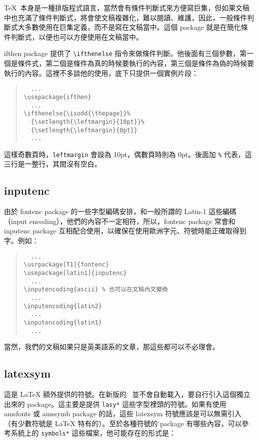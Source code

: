 \TeX\ 本身是一種排版程式語言，當然會有條件判斷式來方便寫巨集，但如果文稿中也充滿了條件判斷式，將會使文稿複雜化，難以閱讀、維護，因此，一般條件判斷式大多數使用在巨集定義，而不是寫在文稿當中。這個 package 就是在簡化條件判斷式，以便也可以方便使用在文稿當中。

\textsf{ifthen} package 提供了 \verb|\ifthenelse| 指令來做條件判斷。他後面有三個參數，第一個是條件式，第二個是條件為真的時候要執行的內容，第三個是條件為偽的時候要執行的內容。這裡不多談他的使用，底下只提供一個實例片段：

\begin{quote}
  \begin{verbatim}
  ...
\usepackage{ifthen}
  ...
\ifthenelse{\isodd{\thepage}}%
  {\setlength{\leftmargin}{10pt}}%
  {\setlength{\leftmargin}{0pt}}
  ...
\end{verbatim}
\end{quote}

這樣奇數頁時，\texttt{leftmargin} 會設為 10pt，偶數頁時則為 0pt。後面加 \texttt{\%} 代表，這三行是一整行，其間沒有空白。

\subsection{inputenc}

由於 \textsf{fontenc} package 的一些字型編碼安排，和一般所謂的 Latin-1 這些編碼（input encoding），他們的內容不一定相符，所以，\textsf{fontenc} package 常會和 \textsf{inputenc} package 互相配合使用，以確保在使用歐洲字元、符號時能正確取得到字。例如：

\begin{quote}
  \begin{verbatim}
  ...
\usrpackage[T1]{fontenc}
\usepackage[latin1]{inputenc}
  ...
\inputencoding{ascii} % 也可以在文稿內文變換
  ...
\inputencoding{latin2}
  ...
\inputencoding{latin1}
  ...
\end{verbatim}
\end{quote}

當然，我們的文稿如果只是英美語系的文章，那這些都可以不必理會。

\subsection{latexsym}
\label{subsec:latexsym}

這是 \LaTeX{} 額外提供的符號。在新版的 \LaTeXe\ 並不會自動載入，要自行引入這個獨立出來的 package。這主要是提供 \texttt{lasy*} 這些字型裡頭的符號。如果有使用 \textsf{amsfonts} 或 \textsf{amssymb} package 的話，這些 \textsf{latexsym} 符號應該是可以無需引入（有少數符號是 \LaTeX{} 特有的）。至於各種符號的 package 有哪些內容，可以參考系統上的 \texttt{symbols*} 這些檔案，他可能存在的形式是：


